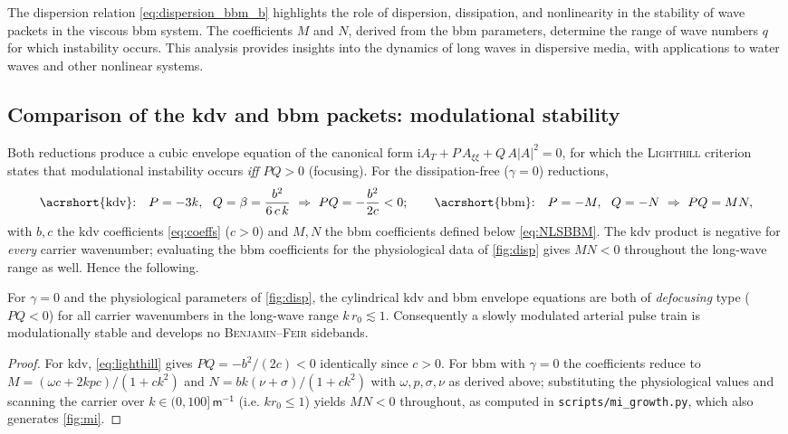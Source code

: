 \documentclass[alpha-refs, 12pt]{wiley-article}
\newcommand{\ui}{\mathrm{i}}
\begin{document}
The dispersion relation \eqref{eq:dispersion_bbm_b} highlights the role of dispersion, dissipation, and nonlinearity in the stability of wave packets in the viscous \acrshort{bbm} system. The coefficients $M$ and $N$, derived from the \acrshort{bbm} parameters, determine the range of wave numbers $q$ for which instability occurs. This analysis provides insights into the dynamics of long waves in dispersive media, with applications to water waves and other nonlinear systems.

\subsection{Comparison of the \acrshort{kdv} and \acrshort{bbm} packets: modulational stability}\label{ssec:MIcompare}

Both reductions produce a cubic envelope equation of the canonical form $\ui A_{T}+P\,A_{\xi\xi}+Q\,A|A|^{2}=0$, for which the \textsc{Lighthill} criterion states that modulational instability occurs \emph{iff} $PQ>0$ (focusing). For the dissipation-free ($\gamma=0$) reductions,
\begin{equation}\label{eq:lighthill}
  \text{\acrshort{kdv}:}\quad P=-3k,\ \ Q=\beta=\frac{b^{2}}{6\,c\,k}\ \Rightarrow\ PQ=-\frac{b^{2}}{2c}<0;
  \qquad
  \text{\acrshort{bbm}:}\quad P=-M,\ \ Q=-N\ \Rightarrow\ PQ=MN,
\end{equation}
with $b,c$ the \acrshort{kdv} coefficients \eqref{eq:coeffs} ($c>0$) and $M,N$ the \acrshort{bbm} coefficients defined below \eqref{eq:NLSBBM}. The \acrshort{kdv} product is negative for \emph{every} carrier wavenumber; evaluating the \acrshort{bbm} coefficients for the physiological data of \cref{fig:disp} gives $MN<0$ throughout the long-wave range as well. Hence the following.

\begin{proposition}\label{prop:MIstable}
For $\gamma=0$ and the physiological parameters of \cref{fig:disp}, the cylindrical \acrshort{kdv} and \acrshort{bbm} envelope equations are both of \emph{defocusing} type ($PQ<0$) for all carrier wavenumbers in the long-wave range $k\,r_{0}\lesssim1$. Consequently a slowly modulated arterial pulse train is modulationally stable and develops no \textsc{Benjamin}--\textsc{Feir} sidebands.
\end{proposition}
\begin{proof}
For \acrshort{kdv}, \eqref{eq:lighthill} gives $PQ=-b^{2}/(2c)<0$ identically since $c>0$. For \acrshort{bbm} with $\gamma=0$ the coefficients reduce to $M=(\omega c+2kpc)/(1+ck^{2})$ and $N=bk(\nu+\sigma)/(1+ck^{2})$ with $\omega,p,\sigma,\nu$ as derived above; substituting the physiological values and scanning the carrier over $k\in(0,100]\,\mathsf{m^{-1}}$ (i.e. $kr_{0}\le1$) yields $MN<0$ throughout, as computed in \texttt{scripts/mi\_growth.py}, which also generates \cref{fig:mi}.
\end{proof}
\end{document}
